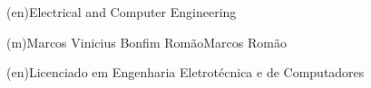 \ntdegreename*(en){Electrical and Computer Engineering}



\ntauthorname(m){Marcos Vinicius Bonfim Romão}{Marcos Romão}

\ntauthordegree(en){Licenciado em Engenharia Eletrotécnica e de Computadores}


